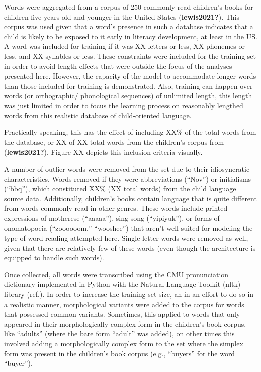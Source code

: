 \documentclass[
  american,
  man,floatsintext]{apa6}
\begin{document}
Words were aggregated from a corpus of 250 commonly read children's books for children five years-old and younger in the United States (\textbf{lewis2021?}). This corpus was used given that a word's presence in such a database indicates that a child is likely to be exposed to it early in literacy development, at least in the US. A word was included for training if it was XX letters or less, XX phonemes or less, and XX syllables or less. These constraints were included for the training set in order to avoid length effects that were outside the focus of the analyses presented here. However, the capacity of the model to accommodate longer words than those included for training is demonstrated. Also, training can happen over words (or orthographic/ phonological sequences) of unlimited length, this length was just limited in order to focus the learning process on reasonably lengthed words from this realistic database of child-oriented language.

Practically speaking, this has the effect of including XX\% of the total words from the database, or XX of XX total words from the children's corpus from (\textbf{lewis2021?}). Figure XX depicts this inclusion criteria visually.

A number of outlier words were removed from the set due to their idiosyncratic characteristics. Words removed if they were abbreviations (``Nov'') or initialisms (``bbq''), which constituted XX\% (XX total words) from the child language source data. Additionally, children's books contain language that is quite different from words commonly read in other genres. These words include printed expressions of motherese (``aaaaa''), sing-song (``yipiyuk''), or forms of onomatopoeia (``zoooooom,'' ``wooshee'') that aren't well-suited for modeling the type of word reading attempted here. Single-letter words were removed as well, given that there are relatively few of these words (even though the architecture is equipped to handle such words).

Once collected, all words were transcribed using the CMU pronunciation dictionary implemented in Python with the Natural Language Toolkit (nltk) library (ref.). In order to increase the training set size, an in an effort to do so in a realistic manner, morphological variants were added to the corpus for words that possessed common variants. Sometimes, this applied to words that only appeared in their morphologically complex form in the children's book corpus, like ``adults'' (where the bare form ``adult'' was added), on other times this involved adding a morphologically complex form to the set where the simplex form was present in the children's book corpus (e.g., ``buyers'' for the word ``buyer'').
\end{document}
